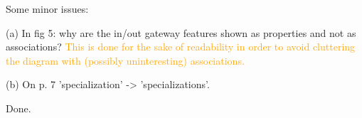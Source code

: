 \documentclass[10pt]{article}
\begin{document}
\begin{response}{Some minor issues:

(a) In fig 5: why are the in/out gateway features shown as properties and not as associations? \textcolor{orange}{This is done for the sake of readability in order to avoid cluttering the diagram with (possibly uninteresting) associations.}

(b) On p. 7 'specialization' -> 'specializations'.}
Done.
\end{response}
\end{document}
